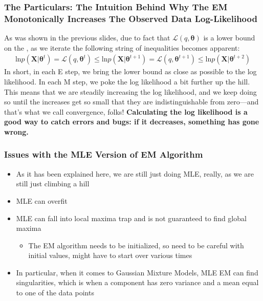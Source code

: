 \documentclass{beamer}
\begin{document}
\begin{frame}
\frametitle{The Particulars: The Intuition Behind Why The EM Monotonically Increases The Observed Data Log-Likelihood}
As was shown in the previous slides, due to fact that $\mathcal{L}(q, \boldsymbol{\theta})$ is a lower bound on the , as we iterate the following string of inequalities becomes apparent:
\begin{align}
	\text{ln}p(\mathbf{X}|\boldsymbol{\theta}^{t}) = \mathcal{L}(q, \boldsymbol{\theta}^{t}) \leq \text{ln}p(\mathbf{X}|\boldsymbol{\theta}^{t+1}) = \mathcal{L}(q, \boldsymbol{\theta}^{t+1}) \leq \text{ln}p(\mathbf{X}|\boldsymbol{\theta}^{t+2})
\end{align}
In short, in each E step, we bring the lower bound as close as possible to the log likelihood. In each M step, we poke the log likelihood a bit further up the hill.\\

This means that we are steadily increasing the log likelihood, and we keep doing so until the increases get so small that they are indistinguishable from zero---and that's what we call convergence, folks! \textbf{Calculating the log likelihood is a good way to catch errors and bugs: if it decreases, something has gone wrong.}
\end{frame}

\begin{frame}
\frametitle{Issues with the MLE Version of EM Algorithm}
	\begin{itemize}
		\item As it has been explained here, we are still just doing MLE, really, as we are still just climbing a hill
		\item MLE can overfit
		\item MLE can fall into local maxima trap and is not guaranteed to find global maxima
		\begin{itemize}
			\item The EM algorithm needs to be initialized, so need to be careful with initial values, might have to start over various times
		\end{itemize}
		\item In particular, when it comes to Gaussian Mixture Models, MLE EM can find singularities, which is when a component has zero variance and a mean equal to one of the data points
	\end{itemize}
\end{frame}
\end{document}
